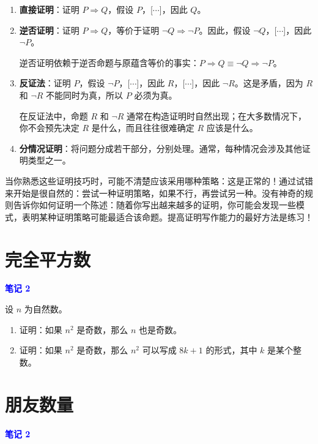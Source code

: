 \documentclass[11pt]{article}
\begin{document}
\begin{enumerate}
\item \textbf{直接证明}：证明 $P \Rightarrow Q$，假设 $P$，[$\cdots$]，因此 $Q$。

\item \textbf{逆否证明}：证明 $P \Rightarrow Q$，等价于证明 $\neg Q \Rightarrow \neg P$。因此，假设 $\neg Q$，[$\cdots$]，因此 $\neg P$。

逆否证明依赖于逆否命题与原蕴含等价的事实：$P \Rightarrow Q \equiv \neg Q \Rightarrow \neg P$。

\item \textbf{反证法}：证明 $P$，假设 $\neg P$，[$\cdots$]，因此 $R$，[$\cdots$]，因此 $\neg R$。这是矛盾，因为 $R$ 和 $\neg R$ 不能同时为真，所以 $P$ 必须为真。

在反证法中，命题 $R$ 和 $\neg R$ 通常在构造证明时自然出现；在大多数情况下，你不会预先决定 $R$ 是什么，而且往往很难确定 $R$ 应该是什么。

\item \textbf{分情况证明}：将问题分成若干部分，分别处理。通常，每种情况会涉及其他证明类型之一。
\end{enumerate}

当你熟悉这些证明技巧时，可能不清楚应该采用哪种策略：这是正常的！通过试错来开始是很自然的：尝试一种证明策略，如果不行，再尝试另一种。没有神奇的规则告诉你如何证明一个陈述：随着你写出越来越多的证明，你可能会发现一些模式，表明某种证明策略可能最适合该命题。提高证明写作能力的最好方法是练习！

\section{完全平方数}

\textcolor{blue}{\textbf{笔记 2}}

设 $n$ 为自然数。

\begin{enumerate}[label=(\alph*)]
\item 证明：如果 $n^2$ 是奇数，那么 $n$ 也是奇数。

\item 证明：如果 $n^2$ 是奇数，那么 $n^2$ 可以写成 $8k+1$ 的形式，其中 $k$ 是某个整数。
\end{enumerate}

\section{朋友数量}

\textcolor{blue}{\textbf{笔记 2}}
\end{document}
